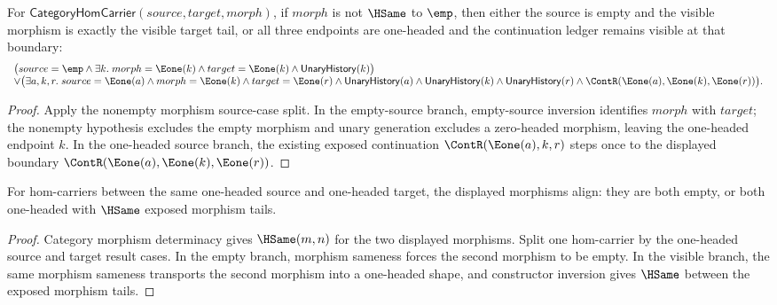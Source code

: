 \begin{theorem}
\label{thm:category-hom-carrier-nonempty-morphism-endpoint-cases}
For \(\mathsf{CategoryHomCarrier}(source,target,morph)\), if \(morph\) is not
\(\HSame\) to \(\emp\), then either the source is empty and the visible
morphism is exactly the visible target tail, or all three endpoints are
one-headed and the continuation ledger remains visible at that boundary:
$$
\begin{array}{l}
\bigl(source=\emp\land
\exists k.\;morph=\Eone(k)\land target=\Eone(k)\land
\mathsf{UnaryHistory}(k)\bigr)
\\
\vee
\bigl(\exists a,k,r.\;source=\Eone(a)\land morph=\Eone(k)\land
target=\Eone(r)\land
\mathsf{UnaryHistory}(a)\land\mathsf{UnaryHistory}(k)\land
\mathsf{UnaryHistory}(r)\land
\ContR(\Eone(a),\Eone(k),\Eone(r))\bigr).
\end{array}
$$
\end{theorem}
\begin{proof}
Apply the nonempty morphism source-case split. In the empty-source branch,
empty-source inversion identifies \(morph\) with \(target\); the nonempty
hypothesis excludes the empty morphism and unary generation excludes a
zero-headed morphism, leaving the one-headed endpoint \(k\). In the one-headed
source branch, the existing exposed continuation \(\ContR(\Eone(a),k,r)\)
steps once to the displayed boundary
\(\ContR(\Eone(a),\Eone(k),\Eone(r))\).
\end{proof}

\begin{theorem}
\label{thm:category-hom-carrier-e1-source-e1-target-morphism-alignment}
For hom-carriers between the same one-headed source and one-headed target,
the displayed morphisms align: they are both empty, or both one-headed with
$\HSame$ exposed morphism tails.
\end{theorem}
\begin{proof}
Category morphism determinacy gives $\HSame(m,n)$ for the two displayed
morphisms. Split one hom-carrier by the one-headed source and target result
cases. In the empty branch, morphism sameness forces the second morphism to be
empty. In the visible branch, the same morphism sameness transports the second
morphism into a one-headed shape, and constructor inversion gives $\HSame$
between the exposed morphism tails.
\end{proof}

